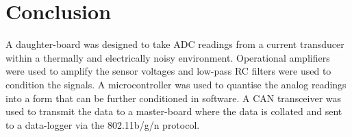 \section{Conclusion}

A daughter-board was designed to take ADC readings from a current transducer within a thermally and electrically noisy environment.
Operational amplifiers were used to amplify the sensor voltages and low-pass RC filters were used to condition the signals.
A microcontroller was used to quantise the analog readings into a form that can be further conditioned in software.
A CAN transceiver was used to transmit the data to a master-board where the data is collated and sent to a data-logger via the 802.11b/g/n protocol.
